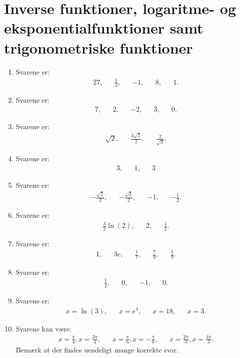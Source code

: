 \section{Inverse funktioner, logaritme- og eksponentialfunktioner samt trigonometriske funktioner}
\begin{enumerate}
	\item Svarene er:
	\begin{align*}
	27,&& \frac{1}{2}, &&-1,&&8,&&1.
	\end{align*}
	\item Svarene er:
	\begin{align*}
	7,&& 2,&& -2,&& 3,&&0.
	\end{align*}
	
	\item Svarene er:
	\begin{align*}
	\sqrt{2},&& \frac{3\sqrt{3}}{2},&& \frac{2}{\sqrt{3}}.
	\end{align*}
	

	\item Svarene er:
	\begin{align*}
	3,&&1,&& 3
	\end{align*}
	
	\item Svarene er:
	\begin{align*}
	-\frac{\sqrt{2}}{2},&& -\frac{\sqrt{3}}{2},&&-1,&& -\frac{1}{2}.
	\end{align*}
	
	
	\item Svarene er:
	\begin{align*}
	\frac{3}{2}\ln(2),&& 2,&& \frac{1}{2}.
	\end{align*}
	
	
	\item Svarene er:
	\begin{align*}
	1,&&3e,&& \frac{1}{7},&& \frac{7}{9},&& \frac{1}{9}.
	\end{align*}
	
	\item Svarene er:
	\begin{align*}
	\frac{1}{2},&& 0,&& -1,&& 0.
	\end{align*}
	
	
	\item Svarene er:
	\begin{align*}
	x=\ln(3),&& x=e^4,&& x=18,&& x=3.
	\end{align*}
	

	\item Svarene kan være:
	\begin{align*}
	x=\frac{\pi}{4},x=\frac{3\pi}{4},&& x=\frac{\pi}{6},x=-\frac{\pi}{6},&& x=\frac{2\pi}{3},x=\frac{4\pi}{3}.
	\end{align*}
	Bemærk at der findes uendeligt mange korrekte svar.


\end{enumerate}
